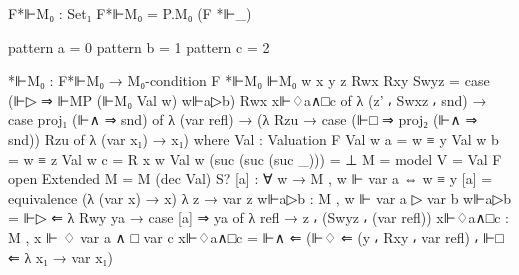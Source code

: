 \begin{spverbatim}
  F*⊩M₀ : Set₁
  F*⊩M₀ = P.M₀ (F *⊩_)

  pattern a = 0
  pattern b = 1
  pattern c = 2

  *⊩M₀ : F*⊩M₀ → M₀-condition F
  *⊩M₀ ⊩M₀ {w} {x} {y} {z} Rwx Rxy Swyz =
    case (⊩▷ ⇒ ⊩MP (⊩M₀ Val w) w⊩a▷b) Rwx x⊩♢a∧□c of
    λ { (z' ⸴ Swxz ⸴ snd) → case proj₁ (⊩∧ ⇒ snd) of
    λ { (var refl) → (λ {Rzu → case (⊩□ ⇒ proj₂ (⊩∧ ⇒ snd)) Rzu of
    λ {(var x₁) → x₁}})} }
    where
    Val : Valuation F
    Val w a = w ≡ y
    Val w b = w ≡ z
    Val w c = R x w
    Val w (suc (suc (suc _))) = ⊥
    M = model {V = Val} F
    open Extended {M = M} (dec Val) S?
    [a] : ∀ {w} → M , w ⊩ var a ⇔ w ≡ y
    [a] = equivalence (λ { (var x) → x}) λ {z → var z}
    w⊩a▷b : M , w ⊩ var a ▷ var b
    w⊩a▷b = ⊩▷ ⇐ λ { Rwy ya → case [a] ⇒ ya of
      λ {refl → z ⸴ (Swyz ⸴ (var refl))}}
    x⊩♢a∧□c : M , x ⊩ ♢ var a ∧ □ var c
    x⊩♢a∧□c = ⊩∧ ⇐ (⊩♢ ⇐ (y ⸴ Rxy ⸴ var refl) ⸴ ⊩□ ⇐
      λ {x₁ → var x₁})
\end{spverbatim}
